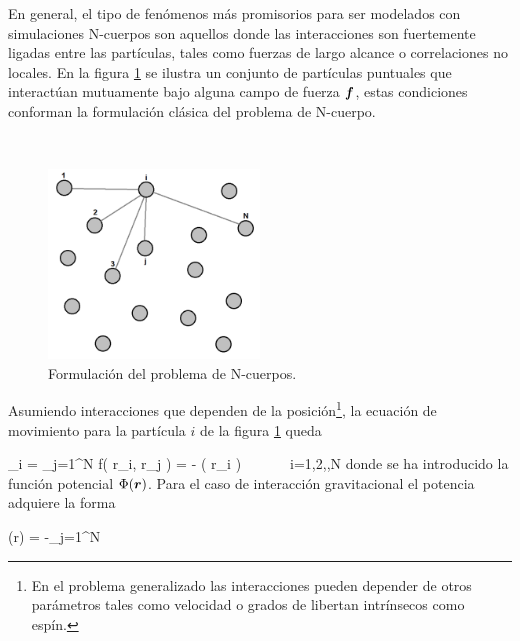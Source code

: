 En general, el tipo de fenómenos más promisorios para ser modelados con 
simulaciones N-cuerpos son aquellos donde las interacciones son 
fuertemente ligadas entre las partículas, tales como fuerzas de largo 
alcance o correlaciones no locales. En la figura \ref{fig:NbodyProblem}
se ilustra un conjunto de partículas puntuales que interactúan mutuamente 
bajo alguna campo de fuerza $\boldsymbol{ f }$, estas condiciones conforman la 
formulación clásica del problema de N-cuerpo.

\
\begin{figure}[htbp]
	\centering
	\includegraphics[width=0.50\textwidth]
	{./figures/3_nbody_simulations/Nbody_Problem.png}

	\caption{\small{Formulación del problema de N-cuerpos.}}
	
	\label{fig:NbodyProblem}
\end{figure}


Asumiendo interacciones que dependen de la posición\footnote{En el 
problema generalizado las interacciones pueden depender de otros 
parámetros tales como velocidad o grados de libertan intrínsecos como 
espín.}, la ecuación de movimiento para la partícula $i$ de la figura
\ref{fig:NbodyProblem} queda \cite{pfalzner1996} \cite{binney2008}


{ _i = \sum_{j=1}^N \bds f( \bds r_i, \bds r_j ) = -\nabla 
\phi( \bds r_i )\ \ \ \ \ \ \ i=1,2,\cdots,N }
donde se ha introducido la función potencial $\Phi(\boldsymbol{ r })$. Para el caso 
de interacción gravitacional el potencia adquiere la forma


{ \phi(\bds r) = -\sum_{j=1}^N   }


